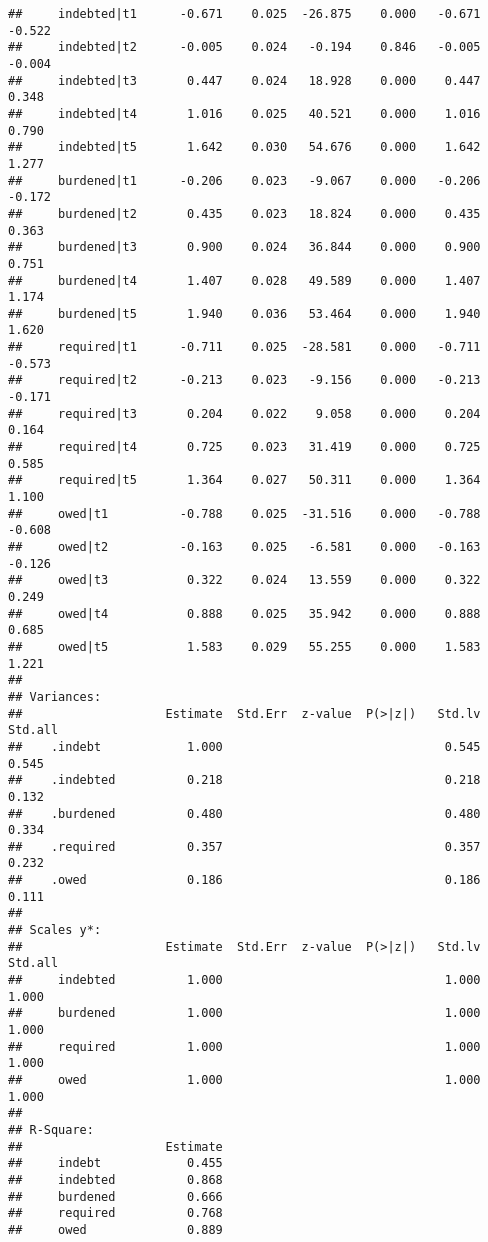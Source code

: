 \documentclass[
]{article}
\begin{document}
\begin{verbatim}
##     indebted|t1      -0.671    0.025  -26.875    0.000   -0.671   -0.522
##     indebted|t2      -0.005    0.024   -0.194    0.846   -0.005   -0.004
##     indebted|t3       0.447    0.024   18.928    0.000    0.447    0.348
##     indebted|t4       1.016    0.025   40.521    0.000    1.016    0.790
##     indebted|t5       1.642    0.030   54.676    0.000    1.642    1.277
##     burdened|t1      -0.206    0.023   -9.067    0.000   -0.206   -0.172
##     burdened|t2       0.435    0.023   18.824    0.000    0.435    0.363
##     burdened|t3       0.900    0.024   36.844    0.000    0.900    0.751
##     burdened|t4       1.407    0.028   49.589    0.000    1.407    1.174
##     burdened|t5       1.940    0.036   53.464    0.000    1.940    1.620
##     required|t1      -0.711    0.025  -28.581    0.000   -0.711   -0.573
##     required|t2      -0.213    0.023   -9.156    0.000   -0.213   -0.171
##     required|t3       0.204    0.022    9.058    0.000    0.204    0.164
##     required|t4       0.725    0.023   31.419    0.000    0.725    0.585
##     required|t5       1.364    0.027   50.311    0.000    1.364    1.100
##     owed|t1          -0.788    0.025  -31.516    0.000   -0.788   -0.608
##     owed|t2          -0.163    0.025   -6.581    0.000   -0.163   -0.126
##     owed|t3           0.322    0.024   13.559    0.000    0.322    0.249
##     owed|t4           0.888    0.025   35.942    0.000    0.888    0.685
##     owed|t5           1.583    0.029   55.255    0.000    1.583    1.221
## 
## Variances:
##                    Estimate  Std.Err  z-value  P(>|z|)   Std.lv  Std.all
##    .indebt            1.000                               0.545    0.545
##    .indebted          0.218                               0.218    0.132
##    .burdened          0.480                               0.480    0.334
##    .required          0.357                               0.357    0.232
##    .owed              0.186                               0.186    0.111
## 
## Scales y*:
##                    Estimate  Std.Err  z-value  P(>|z|)   Std.lv  Std.all
##     indebted          1.000                               1.000    1.000
##     burdened          1.000                               1.000    1.000
##     required          1.000                               1.000    1.000
##     owed              1.000                               1.000    1.000
## 
## R-Square:
##                    Estimate
##     indebt            0.455
##     indebted          0.868
##     burdened          0.666
##     required          0.768
##     owed              0.889
\end{verbatim}
\end{document}
